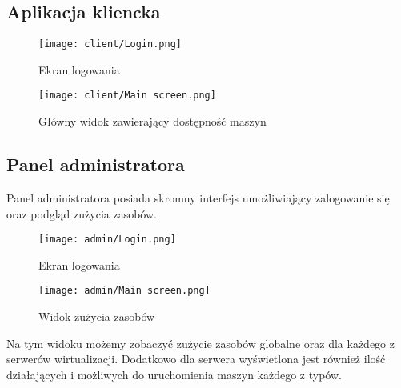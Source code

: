 \documentclass[../../deliverable-two.tex]{subfiles}
\begin{document}
\label{ui}

\subsection{Aplikacja kliencka}

\begin{figure}[h!]
  \centering\texttt{[image: client/Login.png]}
  \caption{Ekran logowania}
\end{figure}

\begin{figure}[h!]
  \centering\texttt{[image: client/Main screen.png]}
  \caption{Główny widok zawierający dostępność maszyn}
\end{figure}

\pagebreak
\subsection{Panel administratora}

Panel administratora posiada skromny interfejs umożliwiający zalogowanie się oraz podgląd zużycia zasobów.

\begin{figure}[h!]
  \centering\texttt{[image: admin/Login.png]}
  \caption{Ekran logowania}
\end{figure}

\begin{figure}[h!]
  \centering\texttt{[image: admin/Main screen.png]}
  \caption{Widok zużycia zasobów}
\end{figure}

Na tym widoku możemy zobaczyć zużycie zasobów globalne oraz dla każdego z serwerów wirtualizacji. Dodatkowo dla serwera wyświetlona jest również ilość działających i możliwych do uruchomienia maszyn każdego z typów.
\end{document}

